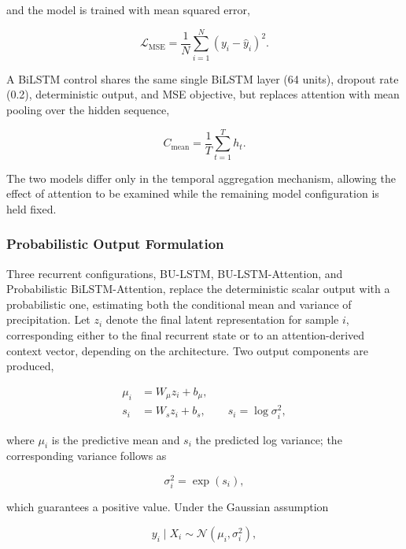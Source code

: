 \documentclass[referee,pdflatex,sn-basic]{sn-jnl}%
\theoremstyle{thmstyleone}%
\theoremstyle{thmstyletwo}%
\theoremstyle{thmstylethree}%
\begin{document}
and the model is trained with mean squared error,

\begin{equation}
\mathcal{L}_{\mathrm{MSE}} = \frac{1}{N} \sum_{i=1}^{N} \left(y_i-\hat{y}_i\right)^2 .
\label{eq:mse_loss}
\end{equation}

A BiLSTM control shares the same single BiLSTM layer (64 units), dropout rate (0.2), deterministic output, and MSE objective, but replaces attention with mean pooling over the hidden sequence,

\begin{equation}
C_{\mathrm{mean}} = \frac{1}{T} \sum_{t=1}^{T} h_t .
\label{eq:mean_pooling}
\end{equation}

The two models differ only in the temporal aggregation mechanism, allowing the effect of attention to be examined while the remaining model configuration is held fixed.


\subsubsection{Probabilistic Output Formulation}
\label{sec:probabilistic_output}

Three recurrent configurations, BU-LSTM, BU-LSTM-Attention, and Probabilistic BiLSTM-Attention, replace the deterministic scalar output with a probabilistic one, estimating both the conditional mean and variance of precipitation. Let $z_i$ denote the final latent representation for sample $i$, corresponding either to the final recurrent state or to an attention-derived context vector, depending on the architecture. Two output components are produced,

\begin{align}
\mu_i &= W_{\mu}z_i+b_{\mu}, \label{eq:prob_mu} \\
s_i &= W_s z_i+b_s, \qquad s_i=\log\sigma_i^2 , \label{eq:prob_logvar}
\end{align}

where $\mu_i$ is the predictive mean and $s_i$ the predicted log variance; the corresponding variance follows as

\begin{equation}
\sigma_i^2 = \exp(s_i),
\label{eq:prob_variance}
\end{equation}

which guarantees a positive value. Under the Gaussian assumption

\begin{equation}
y_i \mid X_i \sim \mathcal{N}\left(\mu_i,\sigma_i^2\right),
\label{eq:gaussian_assumption}
\end{equation}
\end{document}
